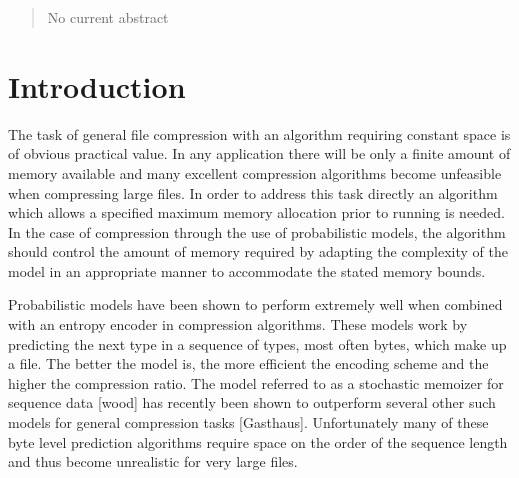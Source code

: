 \documentclass{article}
\begin{document}
 


\begin{abstract} 
No current abstract
\end{abstract} 

\section{Introduction}

The task of general file compression with an algorithm requiring constant space is of obvious practical value.  In any application there will be only a finite amount of memory available and many excellent compression algorithms become unfeasible when compressing large files.  In order to address this task directly an algorithm which allows a specified maximum memory allocation prior to running is needed.  In the case of compression through the use of probabilistic models, the algorithm should control the amount of memory required by adapting the complexity of the model in an appropriate manner to accommodate the stated memory bounds.

Probabilistic models have been shown to perform extremely well when combined with an entropy encoder in compression algorithms.  These models work by predicting the next type in a sequence of types, most often bytes, which make up a file.  The better the model is, the more efficient the encoding scheme and the higher the compression ratio.  The model referred to as a stochastic memoizer for sequence data [wood] has recently been shown to outperform several other such models for general compression tasks [Gasthaus].  Unfortunately many of these byte level prediction algorithms require space on the order of the sequence length and thus become unrealistic for very large files.
\end{document}
